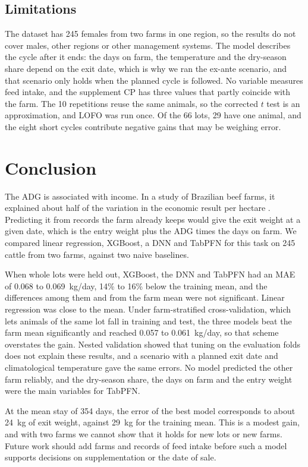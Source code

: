 \documentclass[12pt]{article}
\begin{document}
\subsection{Limitations}

The dataset has 245 females from two farms in one region, so the results do not cover males, other regions or other management systems. The model describes the cycle after it ends: the days on farm, the temperature and the dry-season share depend on the exit date, which is why we ran the ex-ante scenario, and that scenario only holds when the planned cycle is followed. No variable measures feed intake, and the supplement CP has three values that partly coincide with the farm. The 10 repetitions reuse the same animals, so the corrected $t$ test is an approximation, and LOFO was run once. Of the 66 lots, 29 have one animal, and the eight short cycles contribute negative gains that may be weighing error.

\section{Conclusion}

The ADG is associated with income. In a study of Brazilian beef farms, it explained about half of the variation in the economic result per hectare \cite{semchechem2021}. Predicting it from records the farm already keeps would give the exit weight at a given date, which is the entry weight plus the ADG times the days on farm. We compared linear regression, XGBoost, a DNN and TabPFN for this task on 245 cattle from two farms, against two naive baselines.

When whole lots were held out, XGBoost, the DNN and TabPFN had an MAE of 0.068 to 0.069~kg/day, 14\% to 16\% below the training mean, and the differences among them and from the farm mean were not significant. Linear regression was close to the mean. Under farm-stratified cross-validation, which lets animals of the same lot fall in training and test, the three models beat the farm mean significantly and reached 0.057 to 0.061~kg/day, so that scheme overstates the gain. Nested validation showed that tuning on the evaluation folds does not explain these results, and a scenario with a planned exit date and climatological temperature gave the same errors. No model predicted the other farm reliably, and the dry-season share, the days on farm and the entry weight were the main variables for TabPFN.

At the mean stay of 354 days, the error of the best model corresponds to about 24~kg of exit weight, against 29~kg for the training mean. This is a modest gain, and with two farms we cannot show that it holds for new lots or new farms. Future work should add farms and records of feed intake before such a model supports decisions on supplementation or the date of sale.




\end{document}
